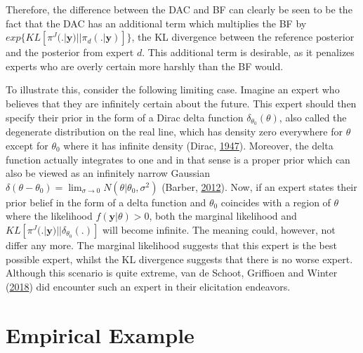 \documentclass[openright,titlepage,12pt,a4paper]{book}
\begin{document}
Therefore, the difference between the DAC and BF can clearly be seen to be the fact that the DAC has an additional term which multiplies the BF by \(exp\{KL[\pi^J(.|\textbf{y})||\pi_d(.|\textbf{y})]\}\), the KL divergence between the reference posterior and the posterior from expert \(d\). This additional term is desirable, as it penalizes experts who are overly certain more harshly than the BF would.

To illustrate this, consider the following limiting case. Imagine an expert who believes that they are infinitely certain about the future. This expert should then specify their prior in the form of a Dirac delta function \(\delta_{\theta_0}(\theta)\), also called the degenerate distribution on the real line, which has density zero everywhere for \(\theta\) except for \(\theta_0\) where it has infinite density (Dirac, \protect\hyperlink{ref-dirac_principles_1947}{1947}). Moreover, the delta function actually integrates to one and in that sense is a proper prior which can also be viewed as an infinitely narrow Gaussian \(\delta(\theta-\theta_0) = \lim_{\sigma\to0}N(\theta|\theta_0, \sigma^2)\) (Barber, \protect\hyperlink{ref-barber_bayesian_2012}{2012}). Now, if an expert states their prior belief in the form of a delta function and \(\theta_0\) coincides with a region of \(\theta\) where the likelihood \(f(\textbf{y}|\theta)>0\), both the marginal likelihood and \(KL[\pi^J(.|\textbf{y})||\delta_{\theta_0}(.)]\) will become infinite. The meaning could, however, not differ any more. The marginal likelihood suggests that this expert is the best possible expert, whilst the KL divergence suggests that there is no worse expert. Although this scenario is quite extreme, van de Schoot, Griffioen and Winter (\protect\hyperlink{ref-van_de_schoot_dealing_2018}{2018}) did encounter such an expert in their elicitation endeavors.

\hypertarget{empirical-example}{%
\section{Empirical Example}\label{empirical-example}}
\end{document}
